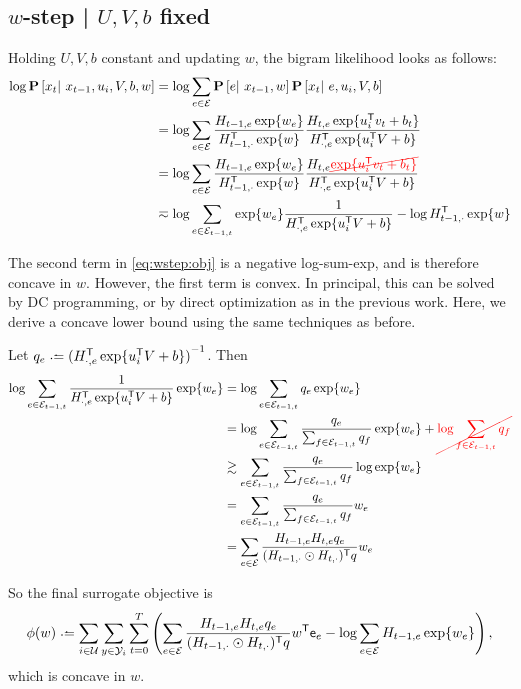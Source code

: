 \documentclass{article}
\newcommand{\ccancel}[2][black]{\color{#1}\cancel{#2}\normalcolor}
\def\e{\ensuremath{\mathsf{e}}}
\def\E{\ensuremath{\mathcal{E}}}
\def\U{\ensuremath{\mathcal{U}}}
\begin{document}
\subsection{$w$-step | $U, V, b$ fixed}
Holding $U, V, b$ constant and updating $w$, the bigram likelihood looks as follows:
\begin{align}
\log\P\left[x_t \given x_{t-1}, u_i, V, b, w\right] &= \log\sum_{e\in \E} \P\left[e \given x_{t-1}, w \right]\P\left[x_t \given e, u_i, V, b \right]\notag\\
&= \log\sum_{e\in \E} \frac{H_{t-1,e} \exp\{w_e\} }{H_{t-1,\cdot}\trans \exp\{w\}} \frac{H_{t,e} \exp\{u_i\trans v_t + b_t \} }{H_{\cdot,e}\trans \exp\{u_i\trans V + b \} }\notag\\
&= \log\sum_{e\in \E} \frac{H_{t-1,e} \exp\{w_e\} }{H_{t-1,\cdot}\trans \exp\{w\}} \frac{H_{t,e} \ccancel[red]{\exp\{u_i\trans v_t + b_t \}} }{H_{\cdot,e}\trans \exp\{u_i\trans V + b \} }\notag\\
&\eqsim \log\sum_{e\in \E_{t-1,t}} \exp\{w_e\} \frac{1}{H_{\cdot,e}\trans \exp\{u_i\trans V + b \} } - \log H_{t-1,\cdot}\trans \exp\{w\} \label{eq:wstep:obj}
\end{align}

The second term in \cref{eq:wstep:obj} is a negative log-sum-exp, and is therefore concave in $w$.  However, the first term is convex.  In principal, this can be solved by DC
programming, or by direct optimization as in the previous work.  Here, we derive a concave lower bound using the same techniques as before.

Let $q_e \defeq {(H_{\cdot, e}\trans \exp\{u_i\trans V + b\})}^{-1}$.  Then
\begin{align}
\log\sum_{e \in \E_{t-1,t}} \frac{1}{H_{\cdot, e}\trans \exp\{u_i \trans V + b\} } \exp\{w_e\} &= \log\sum_{e \in \E_{t-1,t}} q_e \exp\{w_e\} \notag\\
&= \log\sum_{e \in \E_{t-1,t}} \frac{q_e}{\sum_{f \in \E_{t-1,t}} q_f} \exp\{w_e\} + \ccancel[red]{\log\sum_{f\in\E_{t-1,t}} q_f} \notag\\
&\gtrsim \sum_{e\in \E_{t-1,t}} \frac{q_e}{\sum_{f\in\E_{t-1,t}} q_f} \log\exp\{w_e\}\notag\\
&= \sum_{e\in \E_{t-1,t}} \frac{q_e }{\sum_{f\in\E_{t-1,t}} q_f}w_e \notag\\
&= \sum_{e\in\E} \frac{H_{t-1,e}H_{t,e} q_e}{ (H_{t-1,\cdot} \odot H_{t, \cdot})\trans q} w_e\label{eq:wstep:concave}
\end{align}

So the final surrogate objective is
\begin{equation}
\phi(w) \defeq \sum_{i\in\U}\sum_{y\in\Y_i}\sum_{t=0}^T \left(\sum_{e\in\E} \frac{H_{t-1,e} H_{t,e} q_e }{ (H_{t-1,\cdot} \odot H_{t, \cdot})\trans q }w\trans \e_e - 
\log \sum_{e \in \E} H_{t-1, e} \exp\{w_e\}\right), \label{eq:wstep:surrogate}
\end{equation}
which is concave in $w$.
\end{document}
